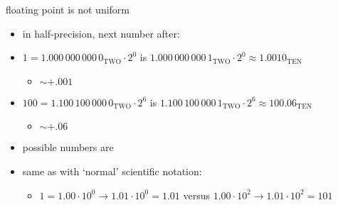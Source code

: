 \begin{frame}{floating point is not uniform}
    \begin{itemize}
    \item in half-precision, next number after:
    \item $1=1.000\,000\,000\,0_\text{TWO}\cdot2^0$ is $1.000\,000\,000\,1_\text{TWO}\cdot2^0\approx1.0010_\text{TEN}$
        \begin{itemize}
        \item $\sim+.001$
        \end{itemize}
    \item $100=1.100\,100\,000\,0_\text{TWO}\cdot2^6$ is $1.100\,100\,000\,1_\text{TWO}\cdot2^6\approx100.06_\text{TEN}$
        \begin{itemize}
        \item $\sim+.06$
        \end{itemize}
        \vspace{.5cm}
    \item possible numbers are 
    \item same as with `normal' scientific notation:
        \begin{itemize}
        \item $1=1.00\cdot10^0\rightarrow1.01\cdot10^0=1.01$ versus $1.00\cdot10^2\rightarrow1.01\cdot10^2=101$
        \end{itemize}
    \end{itemize}
\end{frame}
